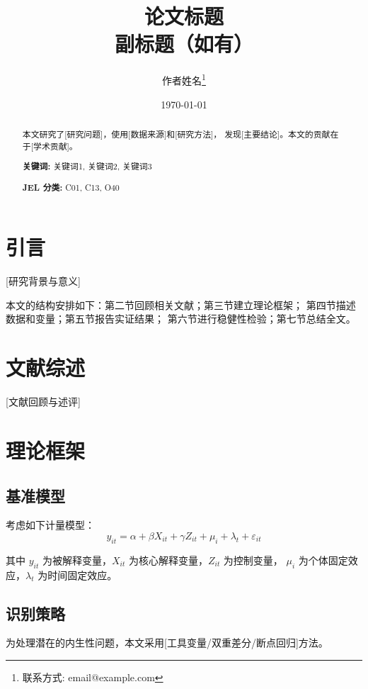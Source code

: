 \documentclass[12pt,a4paper]{article}
\title{论文标题\\\large 副标题（如有）}
\author{作者姓名\thanks{联系方式: email@example.com}}
\date{\today}
\begin{document}
\maketitle

\begin{abstract}
本文研究了[研究问题]，使用[数据来源]和[研究方法]，
发现[主要结论]。本文的贡献在于[学术贡献]。
\vspace{0.5cm}

\noindent\textbf{关键词:} 关键词1, 关键词2, 关键词3

\noindent\textbf{JEL 分类:} C01, C13, O40
\end{abstract}

\section{引言}

[研究背景与意义]

本文的结构安排如下：第二节回顾相关文献；第三节建立理论框架；
第四节描述数据和变量；第五节报告实证结果；
第六节进行稳健性检验；第七节总结全文。

\section{文献综述}

[文献回顾与述评]

\section{理论框架}

\subsection{基准模型}

考虑如下计量模型：
\begin{equation}\label{eq:baseline}
  y_{it} = \alpha + \beta X_{it} + \gamma Z_{it} + \mu_i + \lambda_t + \varepsilon_{it}
\end{equation}

其中 $y_{it}$ 为被解释变量，$X_{it}$ 为核心解释变量，$Z_{it}$ 为控制变量，
$\mu_i$ 为个体固定效应，$\lambda_t$ 为时间固定效应。

\subsection{识别策略}

为处理潜在的内生性问题，本文采用[工具变量/双重差分/断点回归]方法。
\end{document}
